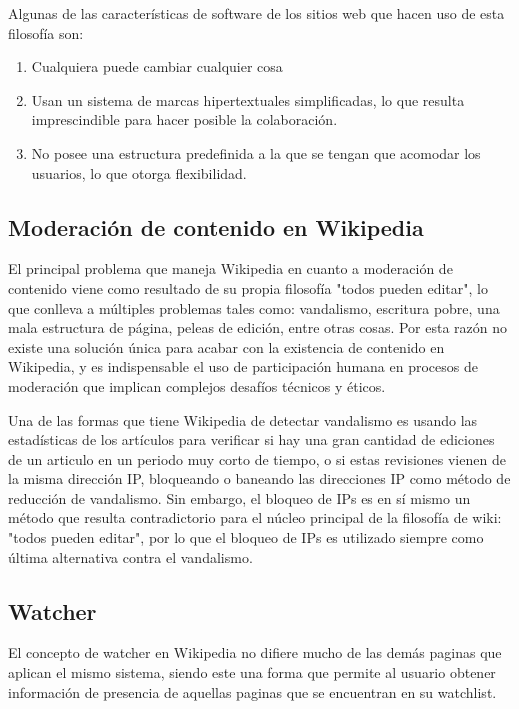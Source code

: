         Algunas de las características de software de los sitios web que hacen uso de esta filosofía son: 
    
        \begin{enumerate}
            \item Cualquiera puede cambiar cualquier cosa
            \item Usan un sistema de marcas hipertextuales simplificadas, lo que resulta imprescindible para hacer posible la colaboración.
            \item No posee una estructura predefinida a la que se tengan que acomodar los usuarios, lo que otorga flexibilidad.
        \end{enumerate}

    \subsection{Moderación de contenido en Wikipedia}

        El principal problema que maneja Wikipedia en cuanto a moderación de contenido viene como resultado de su propia filosofía "todos pueden editar", lo que conlleva a múltiples problemas tales como: vandalismo, escritura pobre, una mala estructura de página, peleas de edición, entre otras cosas. Por esta razón no existe una solución única para acabar con la existencia de  contenido en Wikipedia, y es indispensable el uso de participación humana en procesos de moderación que implican complejos desafíos técnicos y éticos.

        Una de las formas que tiene Wikipedia de detectar vandalismo es usando las estadísticas de los artículos para verificar si hay una gran cantidad de ediciones de un articulo en un periodo muy corto de tiempo, o si estas revisiones vienen de la misma dirección IP, bloqueando o baneando las direcciones IP como método de reducción de vandalismo. Sin embargo, el bloqueo de IPs es en sí mismo un método que resulta contradictorio para el núcleo principal de la filosofía de wiki: "todos pueden editar", por lo que el bloqueo de IPs es utilizado siempre como última alternativa contra el vandalismo.

        
    \subsection{Watcher}
        
        El concepto de watcher en Wikipedia no difiere mucho de las demás paginas que aplican el mismo sistema, siendo este una forma que permite al usuario obtener información de presencia de aquellas paginas que se encuentran en su watchlist.


